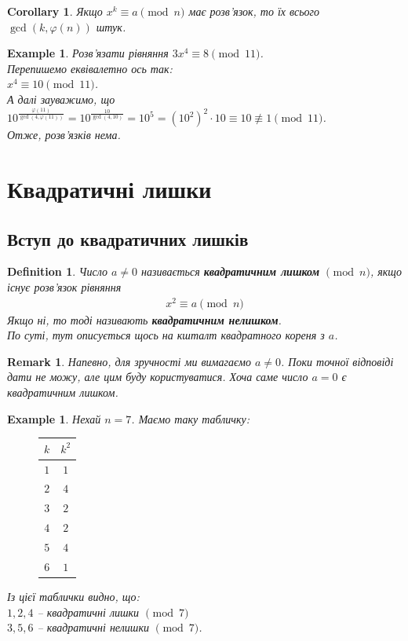 \documentclass[a4paper, 10pt]{article}
\theoremstyle{theoremdd}
\theoremstyle{theoremdd}
\newtheorem{definition}[theorem]{Definition}
\theoremstyle{theoremdd}
\theoremstyle{theoremdd}
\newtheorem{example}[theorem]{Example}
\theoremstyle{theoremdd}
\theoremstyle{theoremdd}
\newtheorem{remark}[theorem]{Remark}
\theoremstyle{theoremdd}
\theoremstyle{theoremdd}
\newtheorem{corollary}[theorem]{Corollary}
\begin{document}
\begin{corollary}
Якщо $x^k \equiv a \pmod n$ має розв'язок, то їх всього $\gcd(k,\varphi(n))$ штук.
\end{corollary}

\begin{example}
Розв'язати рівняння $3x^4 \equiv 8 \pmod {11}$.\\
Перепишемо еквівалетно ось так:\\
$x^4 \equiv 10 \pmod {11}$.\\
А далі зауважимо, що \\
$10^{\frac{\varphi(11)}{\gcd(4,\varphi(11))}} = 10^{\frac{10}{\gcd(4,10)}} = 10^5 = (10^2)^2 \cdot 10 \equiv 10 \not\equiv 1 \pmod {11}$.\\
Отже, розв'язків нема.
\end{example}
\newpage

\section{Квадратичні лишки}
\subsection{Вступ до квадратичних лишків}
\begin{definition}
Число $a \neq 0$ називається \textbf{квадратичним лишком} $\pmod n$, якщо існує розв'язок рівняння
\begin{align*}
x^2 \equiv a \pmod n
\end{align*}
Якщо ні, то тоді називають \textbf{квадратичним нелишком}.\\
По суті, тут описується щось на кшталт квадратного кореня з $a$.
\end{definition}

\begin{remark}
Напевно, для зручності ми вимагаємо $a \neq 0$. Поки точної відповіді дати не можу, але цим буду користуватися. Хоча саме число $a = 0$ є квадратичним лишком.
\end{remark}

\begin{example}
Нехай $n = 7$. Маємо таку табличку:
\begin{figure}[H]
\centering
\begin{tabular}{c|c}
$k$ & $k^2$ \\
\hline
$1$ & $1$ \\
\hline
$2$ & $4$ \\
\hline
$3$ & $2$ \\
\hline
$4$ & $2$ \\
\hline
$5$ & $4$ \\
\hline
$6$ & $1$
\end{tabular}
\end{figure}
Із цієї таблички видно, що:\\
$1,2,4$ -- квадратичні лишки $\!\! \pmod 7$\\
$3,5,6$ -- квадратичні нелишки $\!\! \pmod 7$.
\end{example}
\end{document}
